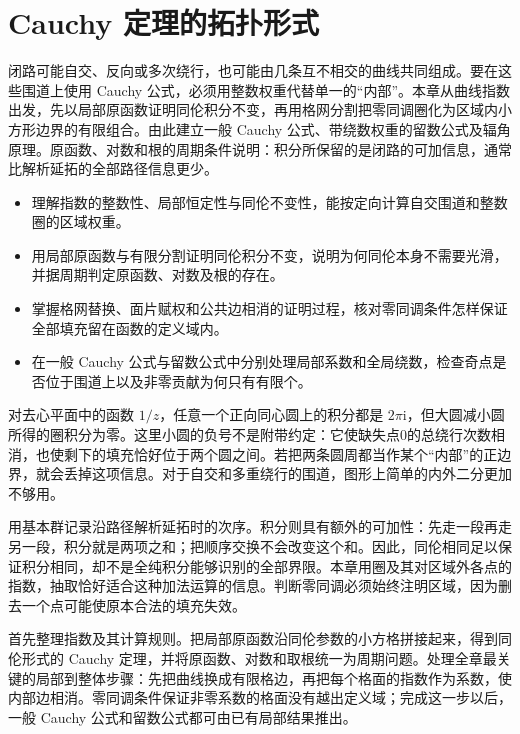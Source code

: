 \chapter{Cauchy 定理的拓扑形式}
\label{b3:ch:10}
\begin{chapterabstract}
闭路可能自交、反向或多次绕行，也可能由几条互不相交的曲线共同组成。要在这些围道上使用 Cauchy 公式，必须用整数权重代替单一的“内部”。本章从曲线指数出发，先以局部原函数证明同伦积分不变，再用格网分割把零同调圈化为区域内小方形边界的有限组合。由此建立一般 Cauchy 公式、带绕数权重的留数公式及辐角原理。原函数、对数和根的周期条件说明：积分所保留的是闭路的可加信息，通常比解析延拓的全部路径信息更少。
\end{chapterabstract}

\begin{learninggoals}
\begin{itemize}
\item\label{b3:item:10-goal-1}理解指数的整数性、局部恒定性与同伦不变性，能按定向计算自交围道和整数圈的区域权重。
\item\label{b3:item:10-goal-2}用局部原函数与有限分割证明同伦积分不变，说明为何同伦本身不需要光滑，并据周期判定原函数、对数及根的存在。
\item\label{b3:item:10-goal-3}掌握格网替换、面片赋权和公共边相消的证明过程，核对零同调条件怎样保证全部填充留在函数的定义域内。
\item\label{b3:item:10-goal-4}在一般 Cauchy 公式与留数公式中分别处理局部系数和全局绕数，检查奇点是否位于围道上以及非零贡献为何只有有限个。
\end{itemize}
\end{learninggoals}

对去心平面中的函数 \(1/z\)，任意一个正向同心圆上的积分都是 \(2\pi\mathrm i\)，但大圆减小圆所得的圈积分为零。这里小圆的负号不是附带约定：它使缺失点0的总绕行次数相消，也使剩下的填充恰好位于两个圆之间。若把两条圆周都当作某个“内部”的正边界，就会丢掉这项信息。对于自交和多重绕行的围道，图形上简单的内外二分更加不够用。

\ProseParagraphBreak
{}用基本群记录沿路径解析延拓时的次序。积分则具有额外的可加性：先走一段再走另一段，积分就是两项之和；把顺序交换不会改变这个和。因此，同伦相同足以保证积分相同，却不是全纯积分能够识别的全部界限。本章用圈及其对区域外各点的指数，抽取恰好适合这种加法运算的信息。判断零同调必须始终注明区域，因为删去一个点可能使原本合法的填充失效。

\ProseParagraphBreak
{}首先整理指数及其计算规则。把局部原函数沿同伦参数的小方格拼接起来，得到同伦形式的 Cauchy 定理，并将原函数、对数和取根统一为周期问题。处理全章最关键的局部到整体步骤：先把曲线换成有限格边，再把每个格面的指数作为系数，使内部边相消。零同调条件保证非零系数的格面没有越出定义域；完成这一步以后，一般 Cauchy 公式和留数公式都可由已有局部结果推出。

